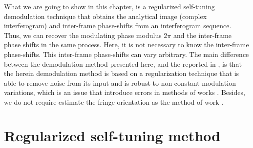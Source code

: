 What we are going to show in this chapter, is a regularized self-tuning
demodulation technique that obtains the analytical image (complex
interferogram) and inter-frame phase-shifts from an interferogram
sequence. Thus, we can recover the modulating phase modulus 2$\pi$
and the inter-frame phase shifts in the same process. Here, it is
not necessary to know the inter-frame phase-shifts. This inter-frame
phase-shifts can vary arbitrary. The main difference between the demodulation
method presented here, and the reported in \cite{Kong,Wang:04,Larkin:02}, is
that the herein demodulation method is based on a regularization technique
that is able to remove noise from its input and is robust to non constant
modulation variations, which is an issue that introduce errors in
methods of works \cite{Kong,Wang:04}. Besides, we do not require estimate
the fringe orientation as the method of work \cite{Larkin:02}.


\section{Regularized self-tuning method}

